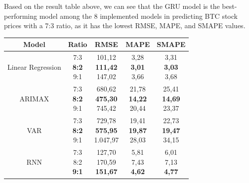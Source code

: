 \documentclass{ieeeojies}
\begin{document}
Based on the result table above, we can see that the GRU model is the best-performing model among the 8 implemented models in predicting BTC stock prices with a 7:3 ratio, as it has the lowest RMSE, MAPE, and SMAPE values.
\begin{table}[H]
    \begin{tabular*}{\linewidth}{@{\extracolsep{\fill}}|c|c|c|c|c|}
        \hline
        \textbf{Model} & \textbf{Ratio} & \textbf{RMSE} & \textbf{MAPE} & \textbf{SMAPE} \\
        \hline
        Linear Regression & \makecell{7:3 \\ \textbf{8:2} \\ 9:1} & \makecell{101,12 \\ \textbf{111,42} \\ 147,02} & \makecell{3,28 \\ \textbf{3,01} \\ 3,66} & \makecell{3,31 \\ \textbf{3,03} \\ 3,68} \\
        \hline
        ARIMAX & \makecell{7:3 \\ \textbf{8:2} \\ 9:1} & \makecell{680,62 \\ \textbf{475,30} \\ 745,42} & \makecell{21,78 \\ \textbf{14,22} \\ 20,44} & \makecell{25,41 \\ \textbf{14,69} \\ 23,37} \\
        \hline
        VAR & \makecell{7:3 \\ \textbf{8:2} \\ 9:1} & \makecell{729,78 \\ \textbf{575,95} \\ 1.047,97} & \makecell{19,41 \\ \textbf{19,87} \\ 28,03} & \makecell{22,73 \\ \textbf{19,47} \\ 34,15} \\
        \hline
        RNN & \makecell{7:3 \\ 8:2 \\ \textbf{9:1}} & \makecell{127,70 \\ 170,59 \\ \textbf{151,67}} & \makecell{5,81 \\ 7,43 \\ \textbf{4,62}} & \makecell{6,01 \\ 7,13 \\ \textbf{4,77}} \\

\end{tabular*}
\end{table}
\end{document}
